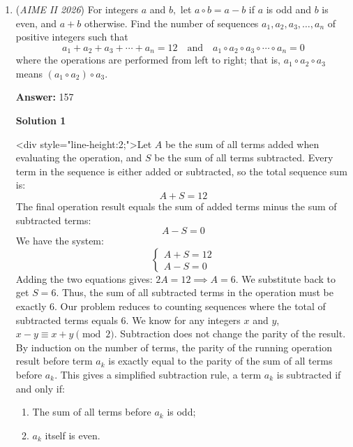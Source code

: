 \begin{enumerate}
 Therefore, at minimum $S$ contains $100+1+1+1+4 = \boxed{107}$ elements.

 


	\item (\textit{AIME II 2026}) For integers $a$ and $b,$ let $a \circ b = a - b$ if $a$ is odd and $b$ is even, and $a+b$ otherwise. Find the number of sequences $a_1, a_2, a_3, \ldots, a_n$ of positive integers such that
 \[a_1 + a_2 + a_3 + \cdots + a_n = 12 \quad \text{and} \quad a_1 \circ a_2 \circ a_3 \circ \cdots \circ a_n = 0\]where the operations are performed from left to right; that is, $a_1 \circ a_2 \circ a_3$ means $(a_1 \circ a_2) \circ a_3.$

 \textbf{Answer: }157



\textbf{Solution 1}

<div style="line-height:2;">Let $A$ be the sum of all terms added when evaluating the operation, and $S$ be the sum of all terms subtracted.
Every term in the sequence is either added or subtracted, so the total sequence sum is:
 \[A + S = 12\]The final operation result equals the sum of added terms minus the sum of subtracted terms:
 \[A - S = 0\]We have the system:
 \[\begin{cases} A + S = 12 \\ A - S = 0 \end{cases}\]Adding the two equations gives: $2A = 12 \implies A = 6$. We substitute back to get $S = 6$. Thus, the sum of all subtracted terms in the operation must be exactly $6$. Our problem reduces to counting sequences where the total of subtracted terms equals $6$.
We know for any integers $x$ and $y$, $x - y \equiv x + y \pmod{2}$. Subtraction does not change the parity of the result. By induction on the number of terms, the parity of the running operation result before term $a_k$ is exactly equal to the parity of the sum of all terms before $a_k$. This gives a simplified subtraction rule, a term $a_k$ is subtracted if and only if:


 
            \begin{enumerate}
        \item The sum of all terms before $a_k$ is odd;
        \item $a_k$ itself is even.
            \end{enumerate}
            

\end{enumerate}
